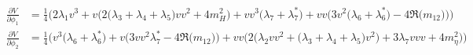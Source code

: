 \begin{align} 
\frac{\partial V}{\partial \phi_1} &= \frac{1}{4} \Big(2 \lambda_1 v^{3}  + v \Big(2 \Big(\lambda_3 + \lambda_4 + \lambda_5\Big)vv^{2}  + 4 m_H^2 \Big) + vv^{3} \Big(\lambda_7 + \lambda_7^*\Big) + vv \Big(3 v^{2} \Big(\lambda_6 + \lambda_6^*\Big) -4 {\Re\Big(m_{12}\Big)} \Big)\Big)\\ 
\frac{\partial V}{\partial \phi_2} &= \frac{1}{4} \Big(v^{3} \Big(\lambda_6 + \lambda_6^*\Big) + v \Big(3 vv^{2} \lambda_7^*  -4 {\Re\Big(m_{12}\Big)} \Big) + vv \Big(2 \Big(\lambda_2 vv^{2}  + \Big(\lambda_3 + \lambda_4 + \lambda_5\Big)v^{2} \Big) + 3 \lambda_7 v vv  + 4 m_\eta^2 \Big)\Big)
\end{align} 
